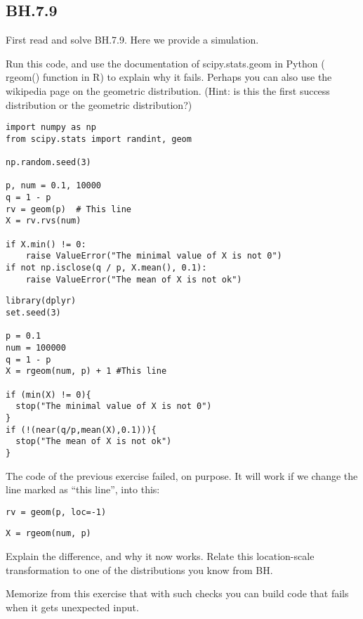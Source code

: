 \subsection{BH.7.9}
\label{sec:bh.7.9}

First read and solve BH.7.9. Here we provide a simulation.

\begin{exercise}
Run this code, and use the documentation of scipy.stats.geom in Python ( rgeom() function in R) to explain why it fails. Perhaps you can also use the wikipedia page on the geometric distribution. (Hint: is this the first success distribution or the geometric distribution?)
\begin{verbatim}
import numpy as np
from scipy.stats import randint, geom

np.random.seed(3)

p, num = 0.1, 10000
q = 1 - p
rv = geom(p)  # This line
X = rv.rvs(num)

if X.min() != 0:
    raise ValueError("The minimal value of X is not 0")
if not np.isclose(q / p, X.mean(), 0.1):
    raise ValueError("The mean of X is not ok")
\end{verbatim}


\begin{verbatim}
library(dplyr)
set.seed(3)

p = 0.1
num = 100000
q = 1 - p
X = rgeom(num, p) + 1 #This line

if (min(X) != 0){
  stop("The minimal value of X is not 0")
}
if (!(near(q/p,mean(X),0.1))){
  stop("The mean of X is not ok")
}
\end{verbatim}
\end{exercise}

\begin{exercise}
The code of the previous exercise failed, on purpose.   It will work if we change the line marked as ``this line'', into this:
\begin{verbatim}
rv = geom(p, loc=-1)
\end{verbatim}

\begin{verbatim}
X = rgeom(num, p)
\end{verbatim}
Explain the difference, and why it now works. Relate this location-scale transformation to one of the distributions you know from BH.
\end{exercise}

Memorize from this exercise that with such checks you can build code that fails when it gets unexpected input.


